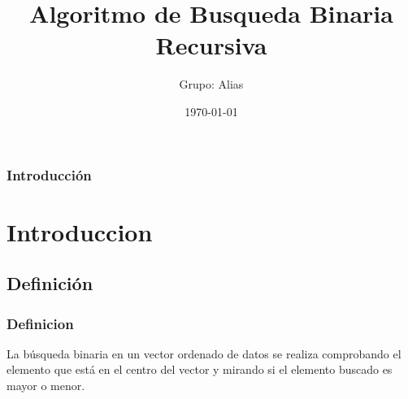\documentclass{beamer}
\title[Busqueda Binaria Recursiva]{Algoritmo de Busqueda Binaria Recursiva} %
\author{Grupo: Alias} %
\institute[UTEM] %
{
Universidad Tecnológica Metropolitana \\ %
\medskip
\url{https://github.com/Lanceconan/AnalisisDeAlgoritmos} %
}
\date{\today} %
\begin{document}

\begin{frame}
	\titlepage %
\end{frame}

\begin{frame}
	\frametitle{Introducción} %
	\tableofcontents %
\end{frame}


\section{Introduccion} %

	\subsection{Definición} %

		\begin{frame}
			\frametitle{Definicion}
				\begin{center}
				La búsqueda binaria en un vector ordenado de datos se realiza comprobando el elemento que está en el centro del vector y mirando si el elemento buscado es mayor o menor. 
				\end{center}
		
		\end{frame}
\end{document}
